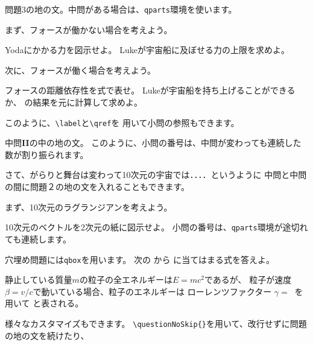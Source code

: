 \documentclass[dvipdfmx,11pt,a4j]{jarticle}
\begin{document}
問題3の地の文。中問がある場合は、{\tt qparts}環境を使います。

\begin{qparts}
	\qpart まず、フォースが働かない場合を考えよう。
		\begin{qlist}
			\qitem Yodaにかかる力を図示せよ。
			\qitem Lukeが宇宙船に及ぼせる力の上限を求めよ。
		\end{qlist}
        
	\qpart 次に、フォースが働く場合を考えよう。
		\begin{qlist}
			\qitem \label{q:forcerange}
				フォースの距離依存性を式で表せ。
			\qitem Lukeが宇宙船を持ち上げることができるか、
				の結果を元に計算して求めよ。
				
				このように、{\tt \verb"\label"}と{\tt \verb"\qref"}を
				用いて小問の参照もできます。
	        \end{qlist}
	        
	        中問{\bf II}の中の地の文。
	       このように、小問の番号は、中問が変わっても連続した数が割り振られます。
\end{qparts}

\bigskip
さて、がらりと舞台は変わって10次元の宇宙では．．．．というように
中問と中問の間に問題２の地の文を入れることもできます。

\begin{qparts}
	\qpart まず、10次元のラグランジアンを考えよう。
		\begin{qlist}
			\qitem 10次元のベクトルを2次元の紙に図示せよ。
			\qitem 小問の番号は、{\tt qparts}環境が途切れても連続します。
		\end{qlist}

\end{qparts}

\clearpage
{}

穴埋め問題には\texttt{qbox}を用います。
次の から に当てはまる式を答えよ。

\begin{qlist}
	\qitem 静止している質量$m$の粒子の全エネルギーは$E = mc^2$であるが、
		粒子が速度$\beta = v/c$で動いている場合、粒子のエネルギーは
		ローレンツファクター $\gamma =\ $\qbox{} を用いて \qbox{}と表される。
\end{qlist}
\clearpage
{}
様々なカスタマイズもできます。
\verb"\questionNoSkip{}"を用いて、改行せずに問題の地の文を続けたり、
\end{document}
